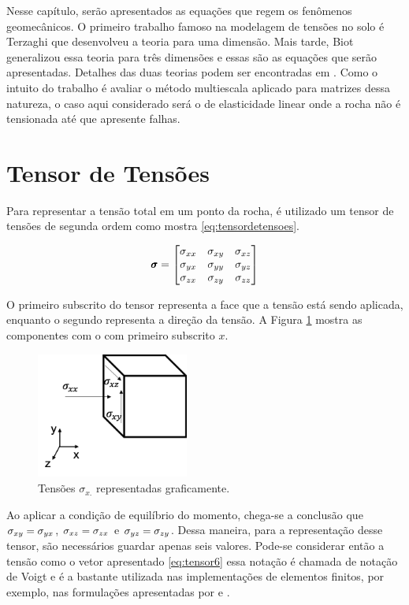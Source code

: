 
Nesse capítulo, serão apresentados as equações que regem os fenômenos geomecânicos. O primeiro trabalho famoso na modelagem de tensões no solo é Terzaghi que desenvolveu a teoria para uma dimensão. Mais tarde, Biot generalizou essa teoria para três dimensões e essas são as equações que serão apresentadas. Detalhes das duas teorias podem ser encontradas em \citet{CompGeomec}. Como o intuito do trabalho é avaliar o método multiescala aplicado para matrizes dessa natureza, o caso aqui considerado será o de elasticidade linear onde a rocha não é tensionada até que apresente falhas.



\section{Tensor de Tensões}

Para representar a tensão total em um ponto da rocha, é utilizado um tensor de tensões de segunda ordem como mostra \eqref{eq:tensordetensoes}.

\begin{equation} \label{eq:tensordetensoes}
\mathbf{\pmb{\sigma}} =
    \begin{bmatrix}
    \sigma_{xx} & \sigma_{xy} & \sigma_{xz} \\
    \sigma_{yx} & \sigma_{yy} & \sigma_{yz} \\
    \sigma_{zx} & \sigma_{zy} & \sigma_{zz}
    \end{bmatrix}
\end{equation}

O primeiro subscrito do tensor representa a face que a tensão está sendo aplicada, enquanto o segundo representa a direção da tensão. A Figura \ref{fig:tensoesx} mostra as componentes com o com primeiro subscrito $x$.


\begin{figure}[!htbp]
\centering
\includegraphics[width=5cm]{chap01/figs/tensor.png}
\caption{Tensões $\sigma_{x.}$ representadas graficamente.}
\label{fig:tensoesx}
\end{figure}

Ao aplicar a condição de equilíbrio do momento, chega-se a conclusão que $\sigma_{xy}=\sigma_{yx}$, $\sigma_{xz}=\sigma_{zx}$ e $\sigma_{yz}=\sigma_{zy}$. Dessa maneira, para a representação desse tensor, são necessários guardar apenas seis valores. Pode-se considerar então a tensão como o vetor apresentado \eqref{eq:tensor6} essa notação é chamada de notação de Voigt e é a bastante utilizada nas implementações de elementos finitos, por exemplo, nas formulações apresentadas por \citet{hughes} e \citet{jacob}.


